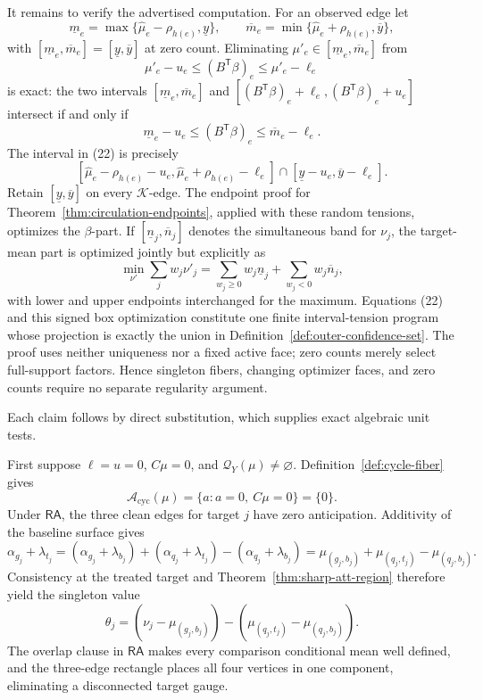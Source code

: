 It remains to verify the advertised computation.  For an observed edge let
\[
 \underline m_e=\max\{\widehat\mu_e-\rho_{h(e)},\underline y\},
 \qquad
 \overline m_e=\min\{\widehat\mu_e+\rho_{h(e)},\overline y\},
\]
with \([\underline m_e,\overline m_e]=[\underline y,\overline y]\) at zero count.  Eliminating \(\mu'_e\in[\underline m_e,\overline m_e]\) from
\[
 \mu'_e-u_e\le(B^{\mathsf T}\beta)_e\le\mu'_e-\ell_e
\]
is exact: the two intervals \([\underline m_e,\overline m_e]\) and \([(B^{\mathsf T}\beta)_e+\ell_e,(B^{\mathsf T}\beta)_e+u_e]\) intersect if and only if
\[
 \underline m_e-u_e\le(B^{\mathsf T}\beta)_e\le\overline m_e-\ell_e. \tag{22}
\]
The interval in (22) is precisely
\[
 [\widehat\mu_e-\rho_{h(e)}-u_e,
   \widehat\mu_e+\rho_{h(e)}-\ell_e]
 \cap[\underline y-u_e,\overline y-\ell_e].
\]
Retain \([\underline y,\overline y]\) on every \(\mathcal K\)-edge.  The endpoint proof for Theorem~\ref{thm:circulation-endpoints}, applied with these random tensions, optimizes the \(\beta\)-part.  If \([\underline n_j,\overline n_j]\) denotes the simultaneous band for \(\nu_j\), the target-mean part is optimized jointly but explicitly as
\[
 \min_{\nu'}\sum_jw_j\nu'_j
 =\sum_{w_j\ge0}w_j\underline n_j+
   \sum_{w_j<0}w_j\overline n_j,
\]
with lower and upper endpoints interchanged for the maximum.  Equations (22) and this signed box optimization constitute one finite interval-tension program whose projection is exactly the union in Definition~\ref{def:outer-confidence-set}.  The proof uses neither uniqueness nor a fixed active face; zero counts merely select full-support factors.  Hence singleton fibers, changing optimizer faces, and zero counts require no separate regularity argument.

Each claim follows by direct substitution, which supplies exact algebraic unit tests.

First suppose \(\ell=u=0\), \(C\mu=0\), and \(\mathcal Q_Y(\mu)\ne\varnothing\).  Definition~\ref{def:cycle-fiber} gives
\[
 \mathcal A_{\mathrm{cyc}}(\mu)=\{a:a=0,\ C\mu=0\}=\{0\}.
\]
Under \(\mathsf{RA}\), the three clean edges for target \(j\) have zero anticipation.  Additivity of the baseline surface gives
\[
 \alpha_{g_j}+\lambda_{t_j}
 = (\alpha_{g_j}+\lambda_{b_j})
 +(\alpha_{q_j}+\lambda_{t_j})
 -(\alpha_{q_j}+\lambda_{b_j})
 =\mu_{(g_j,b_j)}+\mu_{(q_j,t_j)}-\mu_{(q_j,b_j)}.
\]
Consistency at the treated target and Theorem~\ref{thm:sharp-att-region} therefore yield the singleton value
\[
 \theta_j=(\nu_j-\mu_{(g_j,b_j)})
 -(\mu_{(q_j,t_j)}-\mu_{(q_j,b_j)}).
\]
The overlap clause in \(\mathsf{RA}\) makes every comparison conditional mean well defined, and the three-edge rectangle places all four vertices in one component, eliminating a disconnected target gauge.

